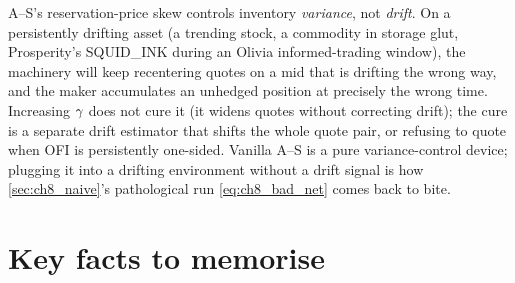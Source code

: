\begin{pitfallbox}
A--S's reservation-price skew controls inventory \emph{variance},
not \emph{drift}. On a persistently drifting asset (a trending
stock, a commodity in storage glut, Prosperity's SQUID\_INK during
an Olivia informed-trading window), the machinery will keep
recentering quotes on a mid that is drifting the wrong way, and the
maker accumulates an unhedged position at precisely the wrong time.
Increasing $\gamma$ does not cure it (it widens quotes without
correcting drift); the cure is a separate drift estimator that
shifts the whole quote pair, or refusing to quote when OFI is
persistently one-sided. Vanilla A--S is a pure variance-control
device; plugging it into a drifting environment without a drift
signal is how \cref{sec:ch8_naive}'s pathological run
\eqref{eq:ch8_bad_net} comes back to bite.
\end{pitfallbox}

\section{Key facts to memorise}
\label{sec:ch8_keyfacts}

